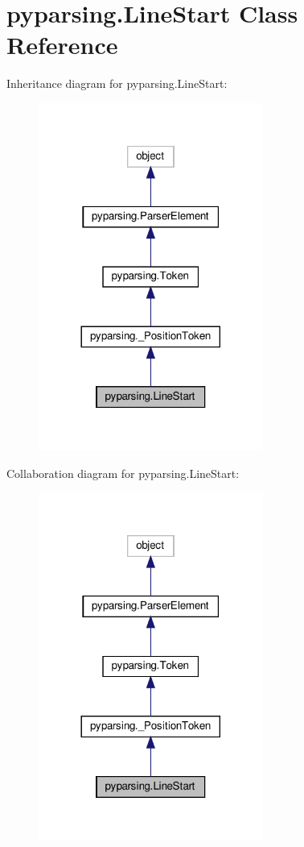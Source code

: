 \hypertarget{classpyparsing_1_1LineStart}{}\section{pyparsing.\+Line\+Start Class Reference}
\label{classpyparsing_1_1LineStart}


Inheritance diagram for pyparsing.\+Line\+Start\+:
\nopagebreak
\begin{figure}[H]
\begin{center}
\leavevmode
\includegraphics[width=209pt]{classpyparsing_1_1LineStart__inherit__graph}
\end{center}
\end{figure}


Collaboration diagram for pyparsing.\+Line\+Start\+:
\nopagebreak
\begin{figure}[H]
\begin{center}
\leavevmode
\includegraphics[width=209pt]{classpyparsing_1_1LineStart__coll__graph}
\end{center}
\end{figure}
